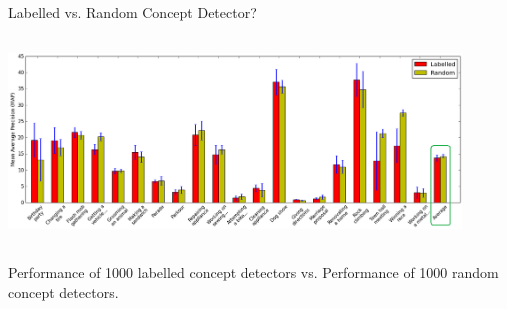 \documentclass{beamer}
\begin{document}
\begin{frame}[t]{Labelled vs. Random Concept Detector?}
\begin{center}
\includegraphics[width=12cm,height=5.5cm]{images/p_exp1.png}
\end{center}

Performance of 1000 labelled concept detectors vs. Performance of 1000 random concept detectors.

\end{frame}
\end{document}
